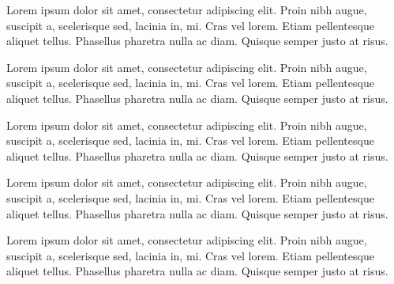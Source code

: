 \documentclass[12pt,a4paper]{article}
\begin{document}
  
  Lorem ipsum dolor sit amet, consectetur adipiscing elit. Proin nibh augue, suscipit a, scelerisque sed, lacinia in, mi. Cras vel lorem. Etiam pellentesque aliquet tellus. Phasellus pharetra nulla ac diam. Quisque semper justo at risus.
  
  Lorem ipsum dolor sit amet, consectetur adipiscing elit. Proin nibh augue, suscipit a, scelerisque sed, lacinia in, mi. Cras vel lorem. Etiam pellentesque aliquet tellus. Phasellus pharetra nulla ac diam. Quisque semper justo at risus.
  
  \hangindent=1.4cm Lorem ipsum dolor sit amet, consectetur adipiscing elit. Proin nibh augue, suscipit a, scelerisque sed, lacinia in, mi. Cras vel lorem. Etiam pellentesque aliquet tellus. Phasellus pharetra nulla ac diam. Quisque semper justo at risus.
  
  \noindent Lorem ipsum dolor sit amet, consectetur adipiscing elit. Proin nibh augue, suscipit a, scelerisque sed, lacinia in, mi. Cras vel lorem. Etiam pellentesque aliquet tellus. Phasellus pharetra nulla ac diam. Quisque semper justo at risus.
  
  \leftskip=1.4cm \rightskip=1.4cm \noindent Lorem ipsum dolor sit amet, consectetur adipiscing elit. Proin nibh augue, suscipit a, scelerisque sed, lacinia in, mi. Cras vel lorem. Etiam pellentesque aliquet tellus. Phasellus pharetra nulla ac diam. Quisque semper justo at risus.
  
\end{document}
